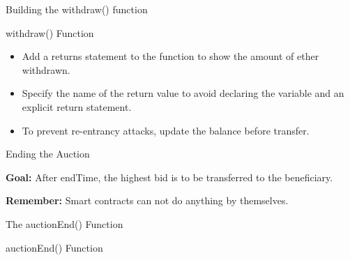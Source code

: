 \documentclass[handout]{beamer}
\begin{document}
\begin{frame}{Building the withdraw() function}

\begin{samplecode}{withdraw() Function}
	
\end{samplecode}

\begin{itemize}
	\item 	Add a returns statement to the function to show the amount of ether withdrawn.
	\item<2->  Specify the name of the return value to avoid declaring the variable and an explicit return statement. 
	\item<3->	To prevent re-entrancy attacks, update the balance \color{focus}before \color{black} transfer.
\end{itemize}

\end{frame}

\begin{frame}{Ending the Auction}

\textbf{Goal:} After endTime, the highest bid is to be transferred to the beneficiary.

\vspace{1.5em}

\textbf{Remember:} Smart contracts can not do anything by themselves.


\end{frame}

\begin{frame}{The auctionEnd() Function}


\begin{samplecode}{auctionEnd() Function}
	
\end{samplecode}

\end{frame}
\end{document}
